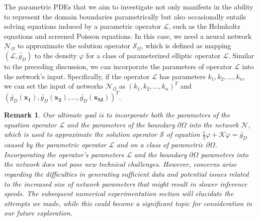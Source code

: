 \documentclass{article}
\newtheorem{remark}{Remark}
\begin{document}
The parametric PDEs that we aim to investigate not only manifests in the ability to represent the domain boundaries parametrically but also occasionally entails solving equations induced by a parametric operator $\mathcal{L}$, such as the Helmholtz equations and screened Poisson equations. In this case, we need a neural network $\mathcal{N}_{\Omega}$ to approximate the solution operator $\mathcal{S}_{\Omega}$, which is defined as mapping $(\mathcal{L}, \widetilde{g_D})$ to the density $\varphi$ for a class of parameterized elliptic operator $\mathcal{L}$. Similar to the preceding discussion, we can incorporate the parameters of operator $\mathcal{L}$ into the network's input. Specifically, if the operator $\mathcal{L}$ has parameters $k_1, k_2, ..., k_n$, we can set the input of networks $\mathcal{N}_{\Omega}$ as $(k_1, k_2, ..., k_n)^T$ and $(\widetilde{g_D}(\mathbf{x_1}), \widetilde{g_D}(\mathbf{x_2}), ..., \widetilde{g_D}(\mathbf{x_M}))^T$. 

\begin{remark}
Our ultimate goal is to incorporate both the parameters of the equation operator $\mathcal{L}$ and the parameters of the boundary $\partial \Omega$ into the network $\mathcal{N}$, which is used to approximate the solution operator $\mathcal{S}$ of equation $\frac{1}{2} \varphi+\mathcal{K} \varphi =  \widetilde{g_D}$ caused by the parametric operator $\mathcal{L}$ and on a class of parametric $\partial \Omega$. Incorporating the operator's parameters $\mathcal{L}$ and the boundary $\partial \Omega$ parameters into the network does not pose new technical challenges. However, concerns arise regarding the difficulties in generating sufficient data and potential issues related to the increased size of network parameters that might result in slower inference speeds. The subsequent numerical experimentation section will elucidate the attempts we made, while this could become a significant topic for consideration in our future exploration.
\end{remark}
\end{document}
